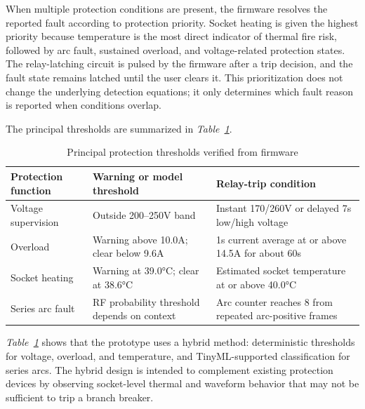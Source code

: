 When multiple protection conditions are present, the firmware resolves the
reported fault according to protection priority. Socket heating is given the
highest priority because temperature is the most direct indicator of thermal
fire risk, followed by arc fault, sustained overload, and voltage-related
protection states. The relay-latching circuit is pulsed by the firmware after a
trip decision, and the fault state remains latched until the user clears it.
This prioritization does not change the underlying detection equations; it only
determines which fault reason is reported when conditions overlap.

The principal thresholds are summarized in \textit{Table~\ref{tab:ch3-protection-summary}}.
\begin{table}[H]
  \centering
  \caption{Principal protection thresholds verified from firmware}
  \label{tab:ch3-protection-summary}
  \begin{tabular}{p{}p{}p{}}
    \toprule
    \textbf{Protection function} & \textbf{Warning or model threshold} & \textbf{Relay-trip condition} \\
    \midrule
    Voltage supervision & Outside 200--250V band & Instant 170/260V or delayed 7s low/high voltage \\
    Overload & Warning above 10.0A; clear below 9.6A & 1s current average at or above 14.5A for about 60s \\
    Socket heating & Warning at 39.0°C; clear at 38.6°C & Estimated socket temperature at or above 40.0°C \\
    Series arc fault & RF probability threshold depends on context & Arc counter reaches 8 from repeated arc-positive frames \\
    \bottomrule
  \end{tabular}
\end{table}

\textit{Table~\ref{tab:ch3-protection-summary}} shows that the prototype uses a hybrid
method: deterministic thresholds for voltage, overload, and temperature, and
TinyML-supported classification for series arcs. The hybrid design is intended
to complement existing protection devices by observing socket-level thermal
and waveform behavior that may not be sufficient to trip a branch breaker.

